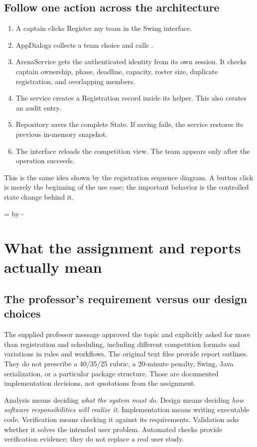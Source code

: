 \documentclass[12pt]{article}
\newcommand{\topic}[1]{\needroom{9\baselineskip}\section{#1}}
\newcommand{\needroom}[1]{\par\begingroup\dimen0=\pagegoal\advance\dimen0 by -\pagetotal\ifdim\dimen0<#1\newpage\fi\endgroup}
\begin{document}
\subsection{Follow one action across the architecture}
\begin{enumerate}
\item A captain clicks Register my team in the Swing interface.
\item AppDialogs collects a team choice and calls .
\item ArenaService gets the authenticated identity from its own session. It checks captain ownership, phase, deadline, capacity, roster size, duplicate registration, and overlapping members.
\item The service creates a Registration record inside its  helper. This also creates an audit entry.
\item Repository saves the complete State. If saving fails, the service restores its previous in-memory snapshot.
\item The interface reloads the competition view. The team appears only after the operation succeeds.
\end{enumerate}
This is the same idea shown by the registration sequence diagram. A button click is merely the beginning of the use case; the important behavior is the controlled state change behind it.

\topic{What the assignment and reports actually mean}
\subsection{The professor's requirement versus our design choices}
The supplied professor message approved the topic and explicitly asked for more than registration and scheduling, including different competition formats and variations in rules and workflows. The original text files provide report outlines. They do not prescribe a 40/35/25 rubric, a 20-minute penalty, Swing, Java serialization, or a particular package structure. Those are documented implementation decisions, not quotations from the assignment.

Analysis means deciding \emph{what the system must do}. Design means deciding \emph{how software responsibilities will realize it}. Implementation means writing executable code. Verification means checking it against its requirements. Validation asks whether it solves the intended user problem. Automated checks provide verification evidence; they do not replace a real user study.
\end{document}
